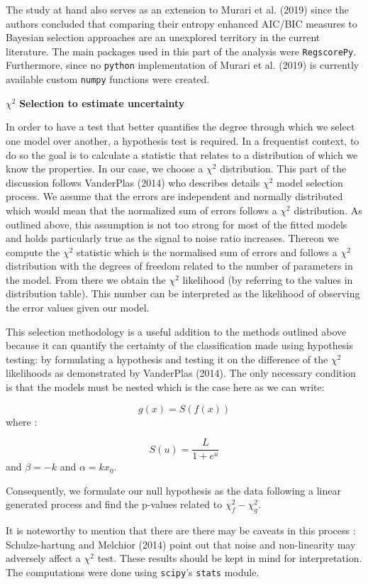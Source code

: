 \documentclass[]{article}
\begin{document}
The study at hand also serves as an extension to Murari et al. (2019)
since the authors concluded that comparing their entropy enhanced
AIC/BIC measures to Bayesian selection approaches are an unexplored
territory in the current literature. The main packages used in this part
of the analysis were \texttt{RegscorePy}. Furthermore, since no
\texttt{python} implementation of Murari et al. (2019) is currently
available custom \texttt{numpy} functions were created.

\(\chi^2\) \textbf{Selection to estimate uncertainty}

In order to have a test that better quantifies the degree through which
we select one model over another, a hypothesis test is required. In a
frequentist context, to do so the goal is to calculate a statistic that
relates to a distribution of which we know the properties. In our case,
we choose a \(\chi^2\) distribution. This part of the discussion follows
VanderPlas (2014) who describes details \(\chi^2\) model selection
process. We assume that the errors are independent and normally
distributed which would mean that the normalized sum of errors follows a
\(\chi^2\) distribution. As outlined above, this assumption is not too
strong for most of the fitted models and holds particularly true as the
signal to noise ratio increases. Thereon we compute the \(\chi^2\)
statistic which is the normalised sum of errors and follows a \(\chi^2\)
distribution with the degrees of freedom related to the number of
parameters in the model. From there we obtain the \(\chi^2\) likelihood
(by referring to the values in distribution table). This number can be
interpreted as the likelihood of observing the error values given our
model.

This selection methodology is a useful addition to the methods outlined
above because it can quantify the certainty of the classification made
using hypothesis testing: by formulating a hypothesis and testing it on
the difference of the \(\chi^2\) likelihoods as demonstrated by
VanderPlas (2014). The only necessary condition is that the models must
be nested which is the case here as we can write:

\[g(x) = S(f(x))\] where :

\[S(u) = \frac{L} {1+e^u}\] and \(\beta = -k\) and \(\alpha = kx_0\).

Consequently, we formulate our null hypothesis as the data following a
linear generated process and find the p-values related to
\(\chi^2_f - \chi^2_g\).

It is noteworthy to mention that there are there may be caveats in this
process : Schulze-hartung and Melchior (2014) point out that noise and
non-linearity may adversely affect a \(\chi^2\) test. These results
should be kept in mind for interpretation. The computations were done
using \texttt{scipy}'s \texttt{stats} module.
\end{document}
